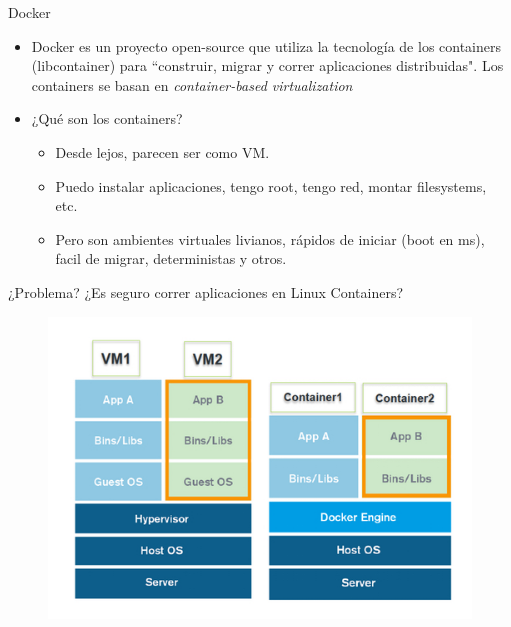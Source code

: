 \documentclass{bredelebeamer}
\begin{document}
\begin{frame}{Docker}
	\begin{itemize}
		\item 	Docker es un proyecto open-source que utiliza la tecnología de los containers (libcontainer) para ``construir, migrar y correr aplicaciones distribuidas". Los containers se basan en \textit{container-based virtualization} 
		\item ¿Qué son los containers?
			\begin{itemize}
				\item Desde lejos, parecen ser como VM.
				\item Puedo instalar aplicaciones, tengo root, tengo red, montar filesystems, etc.
				\item Pero son ambientes virtuales livianos, rápidos de iniciar (boot en ms), facil de migrar, deterministas y otros.
			\end{itemize}
	\end{itemize}

\end{frame}


\begin{frame}{¿Problema?}
¿Es seguro correr aplicaciones en Linux Containers?
	\begin{figure}
		\centering
\includegraphics[width=1\textwidth,]{images/docker_vm}
	\end{figure}
\end{frame}
\end{document}
